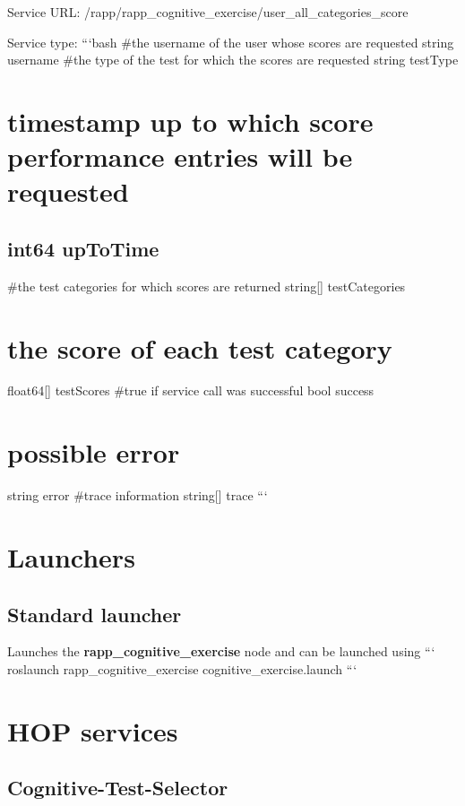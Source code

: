 Service U\-R\-L\-: {\ttfamily /rapp/rapp\-\_\-cognitive\-\_\-exercise/user\-\_\-all\-\_\-categories\-\_\-score}

Service type\-: ```bash \#the username of the user whose scores are requested string username \#the type of the test for which the scores are requested string test\-Type \section*{timestamp up to which score performance entries will be requested}

\subsection*{int64 up\-To\-Time }

\#the test categories for which scores are returned string\mbox{[}\mbox{]} test\-Categories \section*{the score of each test category}

float64\mbox{[}\mbox{]} test\-Scores \#true if service call was successful bool success \section*{possible error}

string error \#trace information string\mbox{[}\mbox{]} trace ```

\section*{Launchers}

\subsection*{Standard launcher}

Launches the {\bfseries rapp\-\_\-cognitive\-\_\-exercise} node and can be launched using ``` roslaunch rapp\-\_\-cognitive\-\_\-exercise cognitive\-\_\-exercise.\-launch ```

\section*{H\-O\-P services}

\subsection*{Cognitive-\/\-Test-\/\-Selector}


